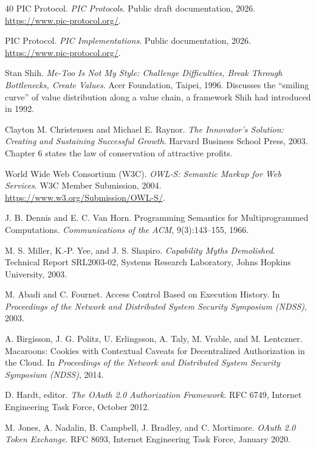\documentclass[10pt,oneside,openany]{book}
\begin{document}
\begin{thebibliography}{40}
PIC Protocol.
\newblock \emph{PIC Protocols}.
\newblock Public draft documentation, 2026. \url{https://www.pic-protocol.org/}.

PIC Protocol.
\newblock \emph{PIC Implementations}.
\newblock Public documentation, 2026. \url{https://www.pic-protocol.org/}.

Stan Shih.
\newblock \emph{Me-Too Is Not My Style: Challenge Difficulties, Break Through Bottlenecks, Create Values}.
\newblock Acer Foundation, Taipei, 1996. Discusses the ``smiling curve'' of value distribution along a value chain, a framework Shih had introduced in 1992.

Clayton M. Christensen and Michael E. Raynor.
\newblock \emph{The Innovator's Solution: Creating and Sustaining Successful Growth}.
\newblock Harvard Business School Press, 2003. Chapter 6 states the law of conservation of attractive profits.

World Wide Web Consortium (W3C).
\newblock \emph{OWL-S: Semantic Markup for Web Services}.
\newblock W3C Member Submission, 2004. \url{https://www.w3.org/Submission/OWL-S/}.

J. B. Dennis and E. C. Van Horn.
\newblock Programming Semantics for Multiprogrammed Computations.
\newblock \emph{Communications of the ACM}, 9(3):143--155, 1966.

M. S. Miller, K.-P. Yee, and J. S. Shapiro.
\newblock \emph{Capability Myths Demolished}.
\newblock Technical Report SRL2003-02, Systems Research Laboratory, Johns Hopkins University, 2003.

M. Abadi and C. Fournet.
\newblock Access Control Based on Execution History.
\newblock In \emph{Proceedings of the Network and Distributed System Security Symposium (NDSS)}, 2003.

A. Birgisson, J. G. Politz, U. Erlingsson, A. Taly, M. Vrable, and M. Lentczner.
\newblock Macaroons: Cookies with Contextual Caveats for Decentralized Authorization in the Cloud.
\newblock In \emph{Proceedings of the Network and Distributed System Security Symposium (NDSS)}, 2014.

D. Hardt, editor.
\newblock \emph{The OAuth 2.0 Authorization Framework}.
\newblock RFC 6749, Internet Engineering Task Force, October 2012.

M. Jones, A. Nadalin, B. Campbell, J. Bradley, and C. Mortimore.
\newblock \emph{OAuth 2.0 Token Exchange}.
\newblock RFC 8693, Internet Engineering Task Force, January 2020.


\end{thebibliography}
\end{document}
